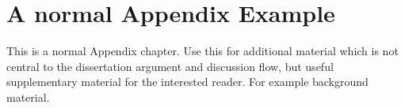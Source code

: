 \chapteropen
\chapter{A normal Appendix Example}
\label{app:appendix_c}

This is a normal Appendix chapter. Use this for additional material which is not central to the dissertation argument and discussion flow, but useful supplementary material for the interested reader. For example background material.
